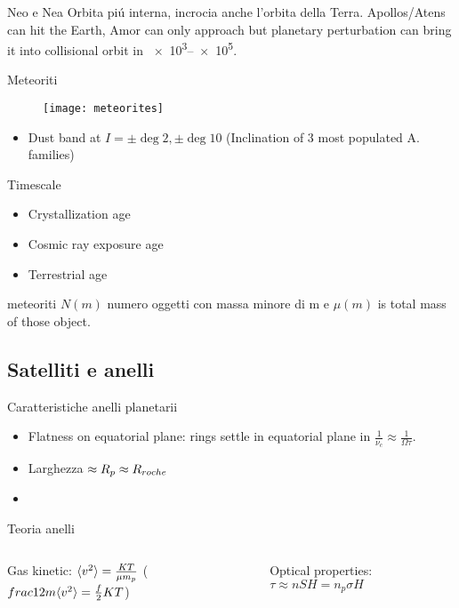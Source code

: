 \begin{wordonframe}{Neo e Nea}
Orbita pi\'u interna, incrocia anche l'orbita della Terra. Apollos/Atens can hit the Earth, Amor can only approach but planetary perturbation can bring it into collisional orbit in \SIrange{e3}{e5}{\year}. 
\end{wordonframe}

\begin{frame}{Meteoriti}
\begin{figure}[!ht]\texttt{[image: meteorites]}\end{figure}
\begin{itemize}
\item Dust band at $I=\pm\deg{2},\pm\deg{10}$ (Inclination of 3 most populated A. families)
\end{itemize}
\begin{block}{Timescale}
\begin{itemize}
\item Crystallization age
\item Cosmic ray exposure age
\item Terrestrial age
\end{itemize}
\end{block}
\end{frame}

\begin{wordonframe}{meteoriti}
$N(m)$ numero oggetti con massa minore di m e $\mu(m)$ is total mass of those object.
\end{wordonframe}

\subsection{Satelliti e anelli}

\begin{frame}{Caratteristiche anelli planetarii}
\begin{itemize}
\item Flatness on equatorial plane: rings settle in equatorial plane in $\frac{1}{\nu_c}\approx \frac{1}{\Omega\tau}$.
\item Larghezza $\approx R_p\approx R_{roche}{}$
\item 
\end{itemize}
\end{frame}

\begin{wordonframe}{Teoria anelli}
\begin{columns}\begin{column}{0.5\textwidth}
Gas kinetic: $\langle v^2 \rangle=\frac{KT}{\mu m_p}$ ($\\frac{1}{2}m\langle v^2 \rangle=\frac{f}{2}KT$)
\end{column} \begin{column}{0.5\textwidth}
Optical properties: $\tau\approx nSH=n_p\sigma H$
\end{column}  \end{columns}
\end{wordonframe}


